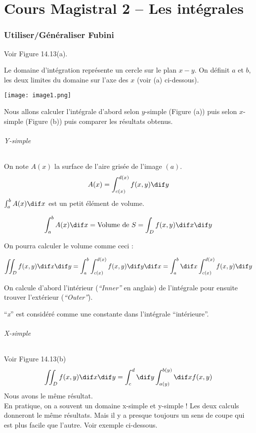 \part{Cours Magistral 2 -- Les intégrales}
\section{Utiliser/Généraliser Fubini}
Voir Figure 14.13(a).

Le domaine d'intégration représente un cercle sur le plan $x-y$. On définit $a$ et $b$, les deux limites du domaine sur l'axe des $x$ (voir (a) ci-dessous).

\texttt{[image: image1.png]}

Nous allons calculer l'intégrale d'abord selon $y$-simple (Figure (a)) puis selon $x$-simple (Figure (b)) puis comparer les résultats obtenus.
\paragraph{Y-simple}
On note $A(x)$ la surface de l'aire grisée de l'image $(a)$.
\[A(x)=\int_{c(x)}^{d(x)}f(x,y)\dif y\]
$\int_a^b A(x) \dif x$ est un petit élément de volume.

\[\int_a^b A(x) \dif x = \text{Volume de }S = \int_Df(x,y) \dif x \dif y\]

On pourra calculer le volume comme ceci :

\[ \iint_D f(x,y) \dif x \dif y = \int_a^b \int_{c(x)}^{d(x)} f(x,y)  \dif y \dif x = \int_a^b \dif x \int_{c(x)}^{d(x)} f(x,y) \dif y \]

On calcule d'abord l'intérieur (\textit{``Inner''} en anglais) de l'intégrale pour ensuite trouver l'extérieur (\textit{``Outer''}).
\begin{myrem}
``\emph{x}'' est considéré comme une constante dans l'intégrale ``intérieure''.
\end{myrem}

\paragraph{X-simple}

Voir Figure 14.13(b)
\[\iint_D f(x,y) \dif x \dif y = \int_c^d \dif y \int_{a(y)}^{b(y)} \dif x f(x,y)\]
Nous avons le même résultat.\\
En pratique, on a souvent un domaine x-simple et y-simple ! Les deux calculs donneront le même résultats. Mais il y a presque toujours un sens de coupe qui est plus facile que l'autre. Voir exemple ci-dessous.

